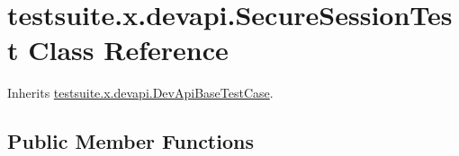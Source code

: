 \hypertarget{classtestsuite_1_1x_1_1devapi_1_1_secure_session_test}{}\section{testsuite.\+x.\+devapi.\+Secure\+Session\+Test Class Reference}
\label{classtestsuite_1_1x_1_1devapi_1_1_secure_session_test}


Inherits \mbox{\hyperlink{classtestsuite_1_1x_1_1devapi_1_1_dev_api_base_test_case}{testsuite.\+x.\+devapi.\+Dev\+Api\+Base\+Test\+Case}}.

\subsection*{Public Member Functions}
